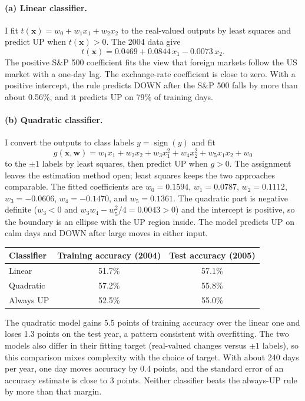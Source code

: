 \paragraph{(a) Linear classifier.}
I fit $t(\mathbf{x}) = w_0 + w_1 x_1 + w_2 x_2$ to the real-valued outputs by least squares and predict UP when
$t(\mathbf{x}) > 0$. The 2004 data give
\[
  t(\mathbf{x}) = 0.0469 + 0.0844\,x_1 - 0.0073\,x_2 .
\]
The positive S\&P 500 coefficient fits the view that foreign markets follow the US market with a one-day lag. The
exchange-rate coefficient is close to zero. With a positive intercept, the rule predicts DOWN after the S\&P 500
falls by more than about 0.56\%, and it predicts UP on 79\% of training days.

\paragraph{(b) Quadratic classifier.}
I convert the outputs to class labels $y = \operatorname{sign}(y)$ and fit
\[
  g(\mathbf{x}, \mathbf{w}) = w_1 x_1 + w_2 x_2 + w_3 x_1^2 + w_4 x_2^2 + w_5 x_1 x_2 + w_0
\]
to the $\pm 1$ labels by least squares, then predict UP when $g > 0$. The assignment leaves the estimation method
open; least squares keeps the two approaches comparable. The fitted coefficients are $w_0 = 0.1594$,
$w_1 = 0.0787$, $w_2 = 0.1112$, $w_3 = -0.0606$, $w_4 = -0.1470$, and $w_5 = 0.1361$. The quadratic part is
negative definite ($w_3 < 0$ and $w_3 w_4 - w_5^2/4 = 0.0043 > 0$) and the intercept is positive, so the boundary is
an ellipse with the UP region inside. The model predicts UP on calm days and DOWN after large moves in either input.

\begin{center}\small
\begin{tabular}{lcc}
\toprule
Classifier & Training accuracy (2004) & Test accuracy (2005) \\
\midrule
Linear & 51.7\% & 57.1\% \\
Quadratic & 57.2\% & 55.8\% \\
Always UP & 52.5\% & 55.0\% \\
\bottomrule
\end{tabular}
\end{center}

The quadratic model gains 5.5 points of training accuracy over the linear one and loses 1.3 points on the test year,
a pattern consistent with overfitting. The two models also differ in their fitting target (real-valued changes versus
$\pm 1$ labels), so this comparison mixes complexity with the choice of target. With about 240 days per year, one day
moves accuracy by 0.4 points, and the standard error of an accuracy estimate is close to 3 points. Neither classifier beats the always-UP rule by more
than that margin.

